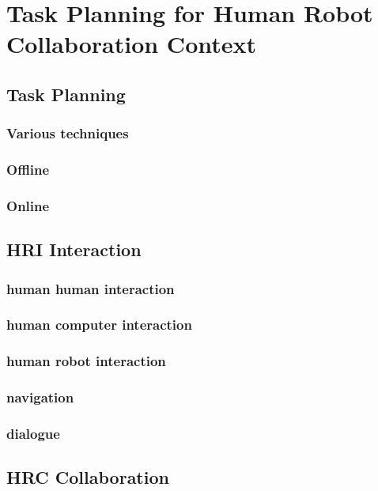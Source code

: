 \ifdefined{}
\else
\setcounter{chapter}{0}
\dominitoc
\faketableofcontents
\fi

\chapter{Task Planning for Human Robot Collaboration Context}
\label{chap:1}
\minitoc

\section{Task Planning}

\subsection{Various techniques}
\subsection{Offline}
\subsection{Online}

\section{HRI Interaction}

\subsection{human human interaction}
\subsection{human computer interaction}
\subsection{human robot interaction}

\subsection{navigation}
\subsection{dialogue}


\section{HRC Collaboration}

